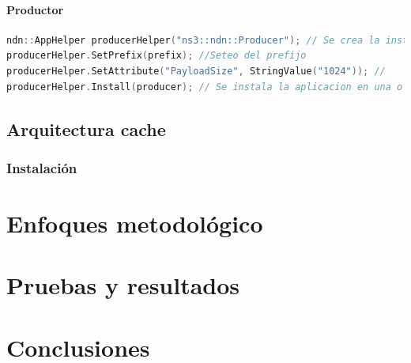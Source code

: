 \documentclass[12pt]{ociamthesis}  %
\begin{document}
\subsubsection{Productor}
\begin{lstlisting}[language=cpp,caption={Caption}]
ndn::AppHelper producerHelper("ns3::ndn::Producer"); // Se crea la instancia
producerHelper.SetPrefix(prefix); //Seteo del prefijo
producerHelper.SetAttribute("PayloadSize", StringValue("1024")); //
producerHelper.Install(producer); // Se instala la aplicacion en una o mas nodos.
\end{lstlisting}

\section{Arquitectura cache}
\subsection{Instalación}


\chapter{Enfoques metodológico}

\chapter{Pruebas y resultados}

\chapter{Conclusiones}

\end{document}
